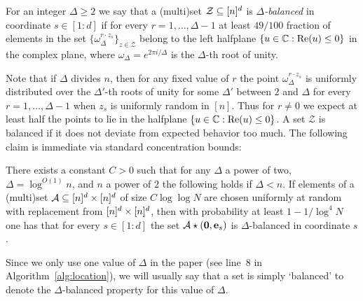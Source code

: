 \begin{definition}\label{def:balance}
For an integer $\Delta\geq 2$  we say that a (multi)set $\mathcal{Z}\subseteq {[n]^d}$ is {\em $\Delta$-balanced} in coordinate $s\in [1:d]$ if for every $r=1,\ldots, \Delta-1$ at least $49/100$ fraction of elements in the set $\{\omega_{\Delta}^{r\cdot z_s}\}_{z\in \mathcal{Z}}$ belong to the left halfplane $\{u\in \mathbb{C}: \text{Re}(u)\leq 0\}$ in the complex plane, where $\omega_\Delta=e^{2\pi i/\Delta}$ is the $\Delta$-th root of unity.
\end{definition}

Note that if $\Delta$ divides $n$, then for any fixed value of $r$ the point $\omega_\Delta^{r\cdot z_s}$ is uniformly distributed over the $\Delta'$-th roots of unity for some $\Delta'$ between $2$ and $\Delta$ for every $r=1,\ldots, \Delta-1$ when $z_s$ is uniformly random in $[n]$. Thus for $r\neq 0$ we expect at least half the points to lie in the halfplane $\{u\in \mathbb{C}: \text{Re}(u)\leq 0\}$. A set $\mathcal{Z}$ is balanced if it does not deviate from expected behavior too much.
The following claim is immediate via standard concentration bounds:

\begin{claim}\label{cl:balanced}
There exists a constant $C>0$ such that for any $\Delta$ a power of two, $\Delta=\log^{O(1)} n$,  and $n$ a power of $2$ the following holds if $\Delta<n$. If elements of a (multi)set ${\mathcal{A}}\subseteq {[n]^d}\times {[n]^d}$ of size $C\log\log N$ are chosen uniformly at random with replacement from ${[n]^d}\times {[n]^d}$, then with probability at least $1-1/\log^4 N$ one has that for every $s\in [1:d]$ the set ${\mathcal{A}}\star (\mathbf{0}, \mathbf{e}_s)$ is $\Delta$-balanced in coordinate $s$.
\end{claim}
Since we only use one value of $\Delta$ in the paper (see line~8 in Algorithm~\ref{alg:location}), we will usually say that a set is simply `balanced'  to denote the $\Delta$-balanced property for this value of $\Delta$.


